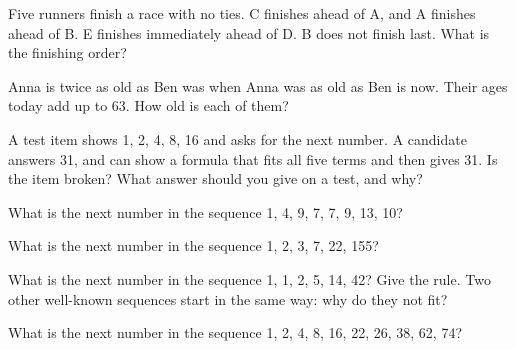 \begin{question}\label{iq:iv1:sequences-patterns-and-aptitude:24}
Five runners finish a race with no ties. C finishes ahead of A, and A finishes ahead of B. E finishes immediately ahead of D. B does not finish last. What is the finishing order?
\end{question}

\begin{question}\label{iq:iv1:sequences-patterns-and-aptitude:25}
Anna is twice as old as Ben was when Anna was as old as Ben is now. Their ages today add up to 63. How old is each of them?
\end{question}

\begin{question}\label{iq:iv1:sequences-patterns-and-aptitude:26}
A test item shows 1, 2, 4, 8, 16 and asks for the next number. A candidate answers 31, and can show a formula that fits all five terms and then gives 31. Is the item broken? What answer should you give on a test, and why?
\end{question}

\begin{question}\label{iq:iv1:sequences-patterns-and-aptitude:27}
What is the next number in the sequence 1, 4, 9, 7, 7, 9, 13, 10?
\end{question}

\begin{question}\label{iq:iv1:sequences-patterns-and-aptitude:28}
What is the next number in the sequence 1, 2, 3, 7, 22, 155?
\end{question}

\begin{question}\label{iq:iv1:sequences-patterns-and-aptitude:29}
What is the next number in the sequence 1, 1, 2, 5, 14, 42? Give the rule. Two other well-known sequences start in the same way: why do they not fit?
\end{question}

\begin{question}\label{iq:iv1:sequences-patterns-and-aptitude:30}
What is the next number in the sequence 1, 2, 4, 8, 16, 22, 26, 38, 62, 74?
\end{question}
